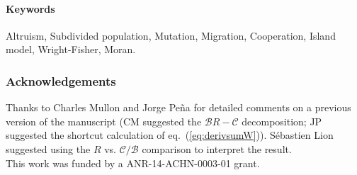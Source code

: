 \documentclass[11pt, letterpaper]{article}
\renewcommand{\eqref}[1]{\textup{{\normalfont eq.~(\ref{#1}}\normalfont)}}
\begin{document}
\paragraph{Keywords} Altruism, Subdivided population, Mutation, Migration, Cooperation, Island model, Wright-Fisher, Moran.




\subsubsection*{Acknowledgements}
Thanks to Charles Mullon and Jorge Pe\~na for detailed comments on a previous version of the manuscript (CM suggested the $\mathcal{B} R - \mathcal{C}$ decomposition; JP suggested the shortcut calculation of \eqref{eq:derivsumW}). S\'ebastien Lion suggested using the $R$ vs. $\mathcal{C}/\mathcal{B}$ comparison to interpret the result. \\
This work was funded by a ANR-14-ACHN-0003-01 grant. 


\end{document}
